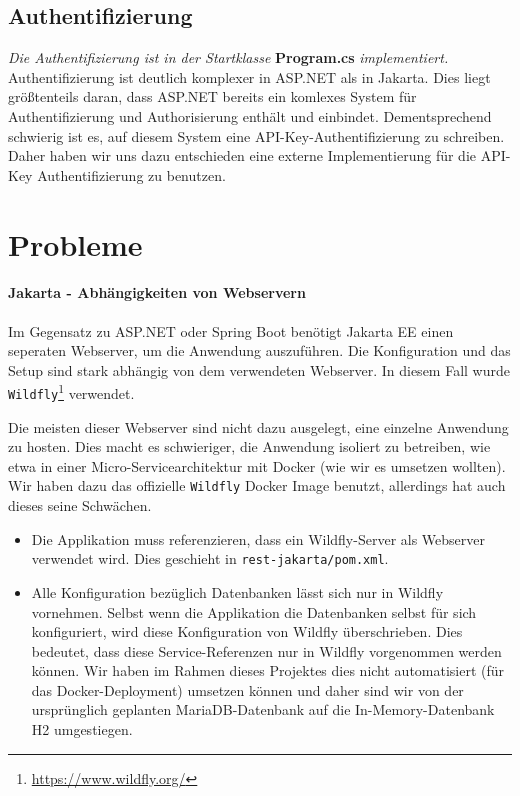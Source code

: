 \subsection{Authentifizierung}

\textit{Die Authentifizierung ist in der Startklasse} \textbf{Program.cs} \textit{implementiert.}\\

Authentifizierung ist deutlich komplexer in ASP.NET als in Jakarta. Dies liegt größtenteils daran,
dass ASP.NET bereits ein komlexes System für Authentifizierung und Authorisierung enthält und einbindet. 
Dementsprechend schwierig ist es, auf diesem System eine API-Key-Authentifizierung zu schreiben. 
Daher haben wir uns dazu entschieden eine externe Implementierung für die API-Key Authentifizierung zu benutzen.

\section{Probleme}

\paragraph{Jakarta - Abhängigkeiten von Webservern}

Im Gegensatz zu ASP.NET oder Spring Boot benötigt Jakarta EE einen seperaten Webserver, um die Anwendung auszuführen. 
Die Konfiguration und das Setup sind stark abhängig von dem verwendeten Webserver. 
In diesem Fall wurde \texttt{Wildfly}\footnote{\url{https://www.wildfly.org/}} verwendet.

Die meisten dieser Webserver sind nicht dazu ausgelegt, eine einzelne Anwendung zu hosten.
Dies macht es schwieriger, die Anwendung isoliert zu betreiben, 
wie etwa in einer Micro-Servicearchitektur mit Docker (wie wir es umsetzen wollten).
Wir haben dazu das offizielle \texttt{Wildfly} Docker Image benutzt,
 allerdings hat auch dieses seine Schwächen.

\begin{itemize}
    \item Die Applikation muss referenzieren, dass ein Wildfly-Server als Webserver verwendet wird.
     Dies geschieht in \texttt{rest-jakarta/pom.xml}.
    \item Alle Konfiguration bezüglich Datenbanken lässt sich nur in Wildfly vornehmen.
     Selbst wenn die Applikation die Datenbanken selbst für sich konfiguriert, wird diese Konfiguration von Wildfly überschrieben.
     Dies bedeutet, dass diese Service-Referenzen nur in Wildfly vorgenommen werden können.
     Wir haben im Rahmen dieses Projektes dies nicht automatisiert (für das Docker-Deployment) umsetzen können
     und daher sind wir von der ursprünglich geplanten MariaDB-Datenbank auf die In-Memory-Datenbank H2 umgestiegen.
\end{itemize}
